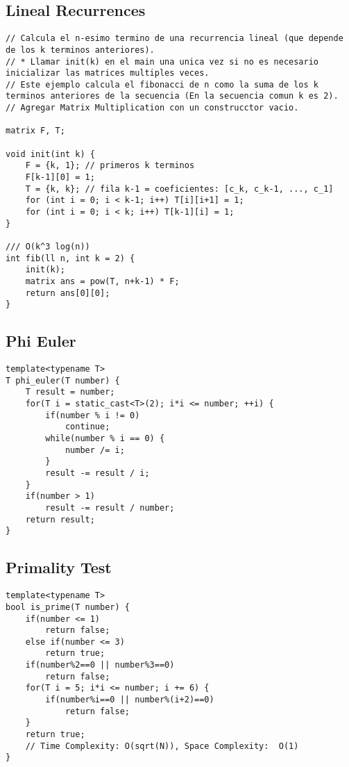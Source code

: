 \documentclass[10pt,letterpaper,twocolumn,twosided]{article}
\begin{document}
\subsection{Lineal Recurrences}
\begin{lstlisting}
// Calcula el n-esimo termino de una recurrencia lineal (que depende de los k terminos anteriores).
// * Llamar init(k) en el main una unica vez si no es necesario inicializar las matrices multiples veces.
// Este ejemplo calcula el fibonacci de n como la suma de los k terminos anteriores de la secuencia (En la secuencia comun k es 2).
// Agregar Matrix Multiplication con un construcctor vacio.

matrix F, T;

void init(int k) {
    F = {k, 1}; // primeros k terminos
    F[k-1][0] = 1;
    T = {k, k}; // fila k-1 = coeficientes: [c_k, c_k-1, ..., c_1]
    for (int i = 0; i < k-1; i++) T[i][i+1] = 1;
    for (int i = 0; i < k; i++) T[k-1][i] = 1;
}

/// O(k^3 log(n))
int fib(ll n, int k = 2) {
    init(k);
    matrix ans = pow(T, n+k-1) * F;
    return ans[0][0];
}
\end{lstlisting}

\subsection{Phi Euler}
\begin{lstlisting}
template<typename T>
T phi_euler(T number) {
    T result = number;
    for(T i = static_cast<T>(2); i*i <= number; ++i) {
        if(number % i != 0)
            continue;
        while(number % i == 0) {
            number /= i;
        }
        result -= result / i;
    }
    if(number > 1)
        result -= result / number;
    return result;
}
\end{lstlisting}

\subsection{Primality Test}
\begin{lstlisting}
template<typename T>
bool is_prime(T number) {
    if(number <= 1)
        return false;
    else if(number <= 3)
        return true;
    if(number%2==0 || number%3==0)
        return false;
    for(T i = 5; i*i <= number; i += 6) {
        if(number%i==0 || number%(i+2)==0)
            return false;
    }
    return true;
    // Time Complexity: O(sqrt(N)), Space Complexity:  O(1)
}
\end{lstlisting}
\end{document}

